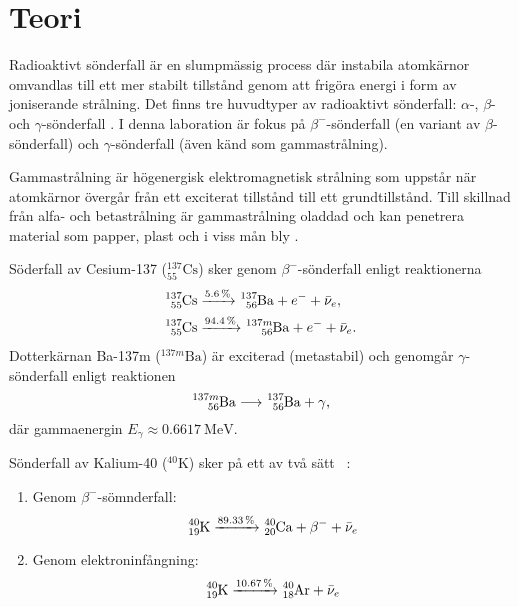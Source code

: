\section{Teori} \label{sec:theory}

Radioaktivt sönderfall är en slumpmässig process där instabila atomkärnor
omvandlas till ett mer stabilt tillstånd genom att frigöra energi i form av
joniserande strålning. Det finns tre huvudtyper av radioaktivt sönderfall:
$\alpha$-, $\beta$- och $\gamma$-sönderfall \parencite{yf}. I denna laboration
är fokus på $\beta^-$-sönderfall (en variant av $\beta$-sönderfall) och
$\gamma$-sönderfall (även känd som gammastrålning).

Gammastrålning är högenergisk elektromagnetisk strålning som uppstår när
atomkärnor övergår från ett exciterat tillstånd till ett grundtillstånd. Till
skillnad från alfa- och betastrålning är gammastrålning oladdad och kan
penetrera material som papper, plast och i viss mån bly
\parencite{spectrometry}.

Söderfall av Cesium-137 ($^{137}_{55}\text{Cs}$) sker genom
$\beta^-$-sönderfall enligt reaktionerna
%
\begin{align}
    \ce{^137_55Cs} &\xrightarrow{\qty{5.6}{\percent}}  \ce{^137_56Ba} + e^- + \bar{\nu}_e,   \label{csdecay1} \\
    \ce{^137_55Cs} &\xrightarrow{\qty{94.4}{\percent}} \ce{^{137m}_56Ba} + e^- + \bar{\nu}_e \label{csdecay2}.
\end{align}
%
Dotterkärnan Ba-137m ($^{137m}\text{Ba}$) är exciterad (metastabil) och
genomgår $\gamma$-sönderfall enligt reaktionen
%
\begin{equation}
    \ce{^{137m}_56Ba} \longrightarrow \ce{^137_56Ba} + \gamma \label{badecay},
\end{equation}
%
där gammaenergin $E_\gamma \approx \qty{0.6617}{\MeV}$.

Sönderfall av Kalium-40 ($^{40}\text{K}$) sker på ett av två sätt
\parencite{nuclear}~\parencite{instructions}:
%
\begin{enumerate}
    \item Genom $\beta^-$-sömnderfall:
    \begin{equation}
        \ce{^40_19K} \xrightarrow{\qty{89.33}{\percent}} \ce{^40_20Ca} + \beta^- + \bar{\nu}_e \label{kdecay1}
    \end{equation}

    \item Genom elektroninfångning:
    \begin{equation}
        \ce{^40_19K} \xrightarrow{\qty{10.67}{\percent}} \ce{^40_18Ar} + \bar{\nu}_e           \label{kdecay2}
    \end{equation}
\end{enumerate}

